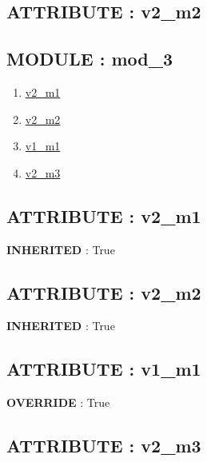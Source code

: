 \subsection*{ATTRIBUTE : v2\_m2}
\hypertarget{ecldoc:intest.in1intest.example_2_intest.in1intest.example_2.mod_2.v2_m2}{}

\subsection*{MODULE : mod\_3}
\hypertarget{ecldoc:intest.in1intest.example_2_intest.in1intest.example_2.mod_3}{}
\begin{enumerate}
\item \hyperlink{ecldoc:intest.in1intest.example_2_intest.in1intest.example_2.mod_1.v2_m1}{v2\_m1}
\item \hyperlink{ecldoc:intest.in1intest.example_2_intest.in1intest.example_2.mod_2.v2_m2}{v2\_m2}
\item \hyperlink{ecldoc:intest.in1intest.example_2_intest.in1intest.example_2.mod_3.v1_m1}{v1\_m1}
\item \hyperlink{ecldoc:intest.in1intest.example_2_intest.in1intest.example_2.mod_3.v2_m3}{v2\_m3}
\end{enumerate}
\subsection*{ATTRIBUTE : v2\_m1}
\hypertarget{ecldoc:intest.in1intest.example_2_intest.in1intest.example_2.mod_1.v2_m1}{}
\textbf{INHERITED} : True \\
\subsection*{ATTRIBUTE : v2\_m2}
\hypertarget{ecldoc:intest.in1intest.example_2_intest.in1intest.example_2.mod_2.v2_m2}{}
\textbf{INHERITED} : True \\
\subsection*{ATTRIBUTE : v1\_m1}
\hypertarget{ecldoc:intest.in1intest.example_2_intest.in1intest.example_2.mod_3.v1_m1}{}
\textbf{OVERRIDE} : True \\
\subsection*{ATTRIBUTE : v2\_m3}
\hypertarget{ecldoc:intest.in1intest.example_2_intest.in1intest.example_2.mod_3.v2_m3}{}

